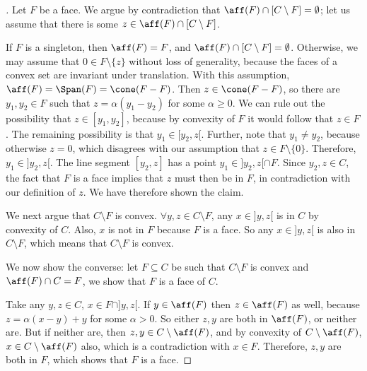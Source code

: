 \documentclass{article}
\theoremstyle{plain}
\theoremstyle{definition}
\theoremstyle{remark}
\begin{document}
\begin{proof}[\hypertarget{loc:characterization_of_convex_faces_by_supporting_subspaces.proof}Proof of \Cref{loc:characterization_of_convex_faces_by_supporting_subspaces.statement}]

Let $F$ be a face. We argue by contradiction that $\aff(F)  \cap [C \setminus F] = \emptyset$;
let us assume that there is some
$z \in \aff(F)  \cap [C\setminus F]$.

If $F$ is a singleton, then $\aff(F) = F$, and $\aff(F) \cap [C \setminus F]= \emptyset$. 
Otherwise, we may assume that $0 \in F \setminus \{z\}$ without
loss of generality, because the faces of a convex set are invariant under translation. With this assumption,
$\aff(F)= \Span(F) = \cone(F-F)$. Then $z \in \cone(F-F)$, 
so there are $y_1, y_2 \in F$ such that $z = \alpha(y_1- y_2)$ for some $\alpha \geq 0$.
We can rule out the possibility that $z \in [y_1, y_2]$,
because by convexity of $F$ it would follow that $z \in F$.
The remaining possibility is that $y_1 \in [y_2, z[$.
Further, note that $y_1 \neq y_2$, because otherwise $z = 0$,
which disagrees with our assumption that $z \in F\setminus \{0\}$.
Therefore, $y_1 \in ]y_2, z[$. The line segment $[y_2, z]$ has a point $y_1 \in ]y_2, z[ \cap F$. Since $y_2, z \in C$,
the fact that $F$ is a face implies that
$z$ must then be in $F$, in contradiction
with our definition of $z$. We have therefore shown the claim.

We next argue that $C \setminus F$ is convex. $\forall y, z \in C\setminus F$, any $x \in ]y, z[$ is in $C$ by convexity of $C$. Also, $x$ is not in $F$ because $F$ is a face. So any $x \in ]y, z[$ is also in
$C\setminus F$, which means that $C\setminus F$ is convex.

We now show the converse: let $F \subseteq C$ be such that $C \setminus F$ is convex and $\aff(F) \cap C = F$, we show that $F$ is a face of $C$.

Take any $y, z \in C$, $x \in F \cap ]y, z[$. If $y \in \aff(F)$ then $z \in \aff(F)$ as well, because $z = \alpha(x-y) + y$ for some $\alpha>0$. So either $z, y$ are both in $\aff(F)$, or neither are. But
if neither are, then $z, y \in C\setminus \aff(F)$, and by convexity of $C \setminus \aff(F)$,
$x \in C\setminus \aff(F)$ also, which is a contradiction with $x \in F$. Therefore, $z, y$ are both in $F$, 
which shows that $F$ is a face.
\end{proof}
\end{document}
